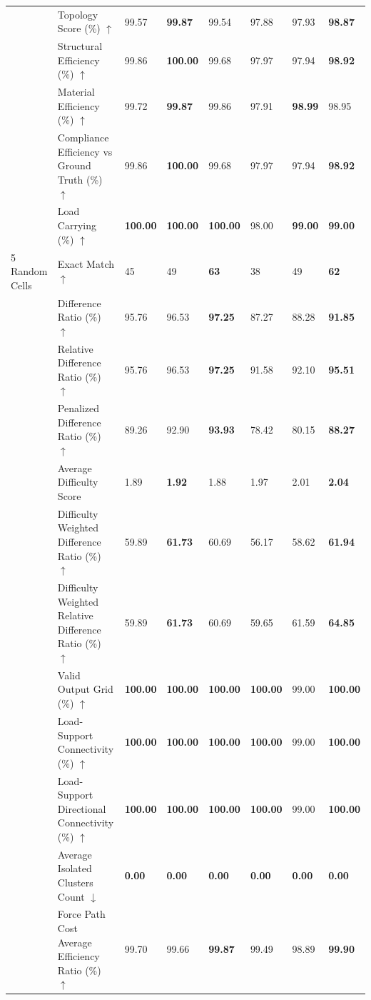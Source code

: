 \begin{table}[!h]
{\begin{tabular}{lllll|lll}
 & Topology Score (\%) $\uparrow$ & 99.57 & \textbf{99.87} & 99.54 & 97.88 & 97.93 & \textbf{98.87} \\
 & Structural Efficiency (\%) $\uparrow$ & 99.86 & \textbf{100.00} & 99.68 & 97.97 & 97.94 & \textbf{98.92} \\
 & Material Efficiency (\%) $\uparrow$ & 99.72 & \textbf{99.87} & 99.86 & 97.91 & \textbf{98.99} & 98.95 \\
 & Compliance Efficiency vs Ground Truth (\%) $\uparrow$ & 99.86 & \textbf{100.00} & 99.68 & 97.97 & 97.94 & \textbf{98.92} \\
 & Load Carrying (\%) $\uparrow$ & \textbf{100.00} & \textbf{100.00} & \textbf{100.00} & 98.00 & \textbf{99.00} & \textbf{99.00} \\
\midrule
5 Random Cells & Exact Match $\uparrow$ & 45 & 49 & \textbf{63} & 38 & 49 & \textbf{62} \\
 & Difference Ratio (\%) $\uparrow$ & 95.76 & 96.53 & \textbf{97.25} & 87.27 & 88.28 & \textbf{91.85} \\
 & Relative Difference Ratio (\%) $\uparrow$ & 95.76 & 96.53 & \textbf{97.25} & 91.58 & 92.10 & \textbf{95.51} \\
 & Penalized Difference Ratio (\%) $\uparrow$ & 89.26 & 92.90 & \textbf{93.93} & 78.42 & 80.15 & \textbf{88.27} \\
 & Average Difficulty Score & 1.89 & \textbf{1.92} & 1.88 & 1.97 & 2.01 & \textbf{2.04} \\
 & Difficulty Weighted Difference Ratio (\%) $\uparrow$ & 59.89 & \textbf{61.73} & 60.69 & 56.17 & 58.62 & \textbf{61.94} \\
 & Difficulty Weighted Relative Difference Ratio (\%) $\uparrow$ & 59.89 & \textbf{61.73} & 60.69 & 59.65 & 61.59 & \textbf{64.85} \\
 & Valid Output Grid (\%) $\uparrow$ & \textbf{100.00} & \textbf{100.00} & \textbf{100.00} & \textbf{100.00} & 99.00 & \textbf{100.00} \\
 & Load-Support Connectivity (\%) $\uparrow$ & \textbf{100.00} & \textbf{100.00} & \textbf{100.00} & \textbf{100.00} & 99.00 & \textbf{100.00} \\
 & Load-Support Directional Connectivity (\%) $\uparrow$ & \textbf{100.00} & \textbf{100.00} & \textbf{100.00} & \textbf{100.00} & 99.00 & \textbf{100.00} \\
 & Average Isolated Clusters Count $\downarrow$ & \textbf{0.00} & \textbf{0.00} & \textbf{0.00} & \textbf{0.00} & \textbf{0.00} & \textbf{0.00} \\
 & Force Path Cost Average Efficiency Ratio (\%) $\uparrow$ & 99.70 & 99.66 & \textbf{99.87} & 99.49 & 98.89 & \textbf{99.90} \\

\end{tabular}}
\end{table}
